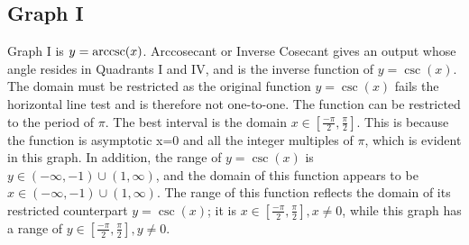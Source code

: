 \subsection{Graph I}

Graph I is ${y=\operatorname{arccsc}(x)}$.
Arccosecant or Inverse Cosecant gives an output whose angle resides in Quadrants I and IV, and is the inverse function of ${y=\csc(x)}$.
The domain must be restricted as the original function ${y=\csc(x)}$ fails the horizontal line test and is therefore not one-to-one.
The function can be restricted to the period of ${\pi}$.
The best interval is the domain ${x \in {[\frac{{-\pi}}{2},\frac{\pi}{2}]}}$.
This is because the function is asymptotic x=0 and all the integer multiples of $\pi$, which is evident in this graph.
In addition, the range of ${y=\csc(x)}$ is ${y \in {{({-\infty}, {-1})} \cup {(1, {\infty})}}}$, and the domain of this function appears to be ${x \in {{({-\infty}, {-1})} \cup {(1, {\infty})}}}$.
The range of this function reflects the domain of its restricted counterpart ${y=\csc(x)}$; it is ${x \in {[\frac{{-\pi}}{2},\frac{\pi}{2}]}, {x \neq 0}}$, while this graph has a range of ${y \in {[\frac{{-\pi}}{2},\frac{\pi}{2}]}, {y \neq 0}}$.
